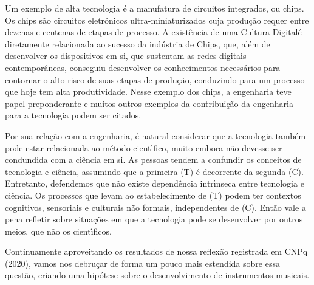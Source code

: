 \documentclass[
12pt,		%
openright,	%
twoside,  %
a4paper,			%
chapter=TITLE,		%
english,			%
french,				%
spanish,			%
brazil				%
]{USPSC-classe/USPSC}
\begin{document}
Um exemplo de alta tecnologia \'e a manufatura de circuitos integrados, ou chips. Os chips s\~ao circuitos eletr\^onicos ultra-miniaturizados cuja produ\c{c}\~ao requer entre dezenas e centenas de etapas de processo. A exist\^encia de uma \textquotedbl Cultura Digital\textquotedbl  \'e diretamente relacionada ao sucesso da ind\'ustria de Chips, que, al\'em de desenvolver os dispositivos em si, que sustentam as redes digitais contempor\^aneas, conseguiu desenvolver os conhecimentos necess\'arios para contornar o alto risco de suas etapas de produ\c{c}\~ao, conduzindo para um processo que hoje tem alta produtividade. Nesse exemplo dos chips, a engenharia teve papel preponderante e muitos outros exemplos da contribui\c{c}\~ao da engenharia para a tecnologia podem ser citados.










Por sua rela\c{c}\~ao com a engenharia, \'e natural considerar que a tecnologia tamb\'em pode estar relacionada ao m\'etodo cient\'{\i}fico, muito embora n\~ao devesse ser condundida com a ci\^encia em si. As pessoas tendem a confundir os conceitos de tecnologia e ci\^encia, assumindo que a primeira (T) \'e decorrente da segunda (C). Entretanto, defendemos que n\~ao existe depend\^encia intr\'{\i}nseca entre tecnologia e ci\^encia. Os processos que levam ao estabelecimento de (T) podem ter contextos cognitivos, sensoriais e culturais n\~ao formais, independentes de (C). Ent\~ao vale a pena refletir sobre situa\c{c}\~oes em que a tecnologia pode se desenvolver por outros meios, que n\~ao os cient\'{\i}ficos.










Continuamente aproveitando os resultados de nossa reflex\~ao registrada em  CNPq (2020), vamos nos debru\c{c}ar de forma um pouco mais estendida sobre essa quest\~ao, criando uma hip\'otese sobre o desenvolvimento de instrumentos musicais.
\end{document}
